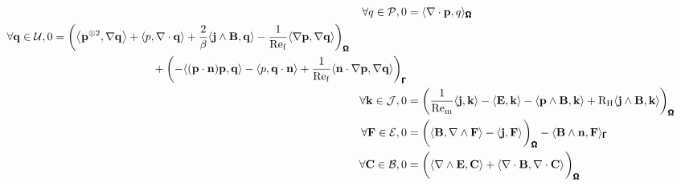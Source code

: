     \begin{align}
        \forall q \in \calP,  0  &=  \langle\nabla\cdot\bfp, q\rangle_{\bfOmega}  \\
        \begin{split}
            \forall \bfq \in \calU,  0  &=  \left(\left\langle\bfp^{\otimes 2}, \nabla\bfq\right\rangle + \langle p, \nabla\cdot\bfq\rangle + \frac{2}{\beta}\langle\bfj\wedge\bfB, \bfq\rangle - \frac{1}{\rmRef}\langle\nabla\bfp, \nabla\bfq\rangle\right)_{\bfOmega}  \\
            &\;\;\;\;\;\;\;\;\;\;\;\;\;\;\;\;\;\;\;\;\;\;\;\;\;\;\;\;\;\;\;\;  + \left(- \langle(\bfp\cdot\bfn)\bfp, \bfq\rangle - \langle p, \bfq\cdot\bfn\rangle + \frac{1}{\rmRef}\langle\bfn\cdot\nabla\bfp, \nabla\bfq\rangle\right)_{\bfGamma}
        \end{split}  \\
        \forall \bfk \in \calJ,  0  &=  \left(\frac{1}{\rmRem}\langle\bfj, \bfk\rangle - \langle\bfE, \bfk\rangle - \langle\bfp\wedge\bfB, \bfk\rangle + \rmRH\langle\bfj\wedge\bfB, \bfk\rangle\right)_{\bfOmega}  \\
        \forall \bfF \in \calE,  0  &=  \left(\langle\bfB, \nabla\wedge\bfF\rangle - \langle\bfj, \bfF\rangle\tall\right)_{\bfOmega} - \langle\bfB\wedge\bfn, \bfF\rangle_{\bfGamma}  \\
        \forall \bfC \in \calB,  0  &=  \left(\langle\nabla\wedge\bfE, \bfC\rangle + \langle\nabla\cdot\bfB, \nabla\cdot\bfC\rangle\tall\right)_{\bfOmega}
    \end{align}
    
